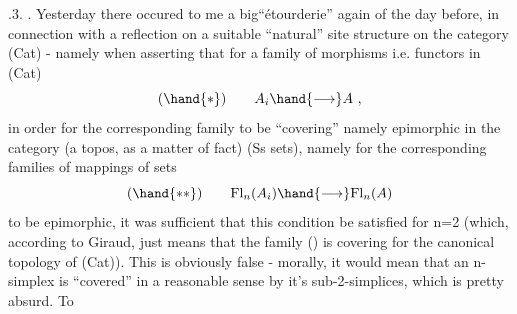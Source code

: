 .3.
. Yesterday there occured to me a big``étourderie'' again of the day
before, in connection with a reflection on a suitable ``natural'' site
structure on the category (Cat) - namely when asserting that for a
family of morphisms i.e. functors in (Cat)
\[ (\hand{*}) \qquad A_i \hand{\longrightarrow} A \ , \]
in order for the corresponding family to be ``covering'' namely epimorphic
in the category (a topos, as a matter of fact) (Ss sets), namely for
the corresponding families of mappings of sets
\[ (\hand{**}) \qquad \mathrm{Fl}_n(A_i) \hand{\longrightarrow} \mathrm{Fl}_n(A) \]
to be epimorphic, it was sufficient that this condition be satisfied
for n=2 (which, according to Giraud, just means that the family (\hand{*})
is covering for the canonical topology of (Cat)). This is obviously
false - morally, it would mean that an n-simplex is ``covered'' in a
reasonable sense by it's sub-2-simplices, which is pretty absurd. To
